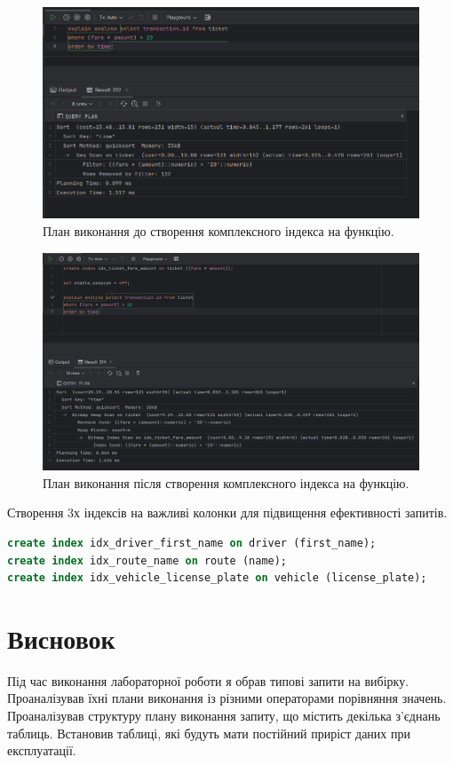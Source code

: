 \documentclass[14pt]{extreport}
\begin{document}
\begin{normalsize}
	\begin{figure}[H]
		\centering
		\includegraphics[scale=0.65]{3}
		\caption{План виконання до створення комплексного індекса на функцію.}
	\end{figure}
	
	\begin{figure}[H]
		\centering
		\includegraphics[scale=0.55]{4}
		\caption{План виконання після створення комплексного індекса на функцію.}
	\end{figure}
	Створення 3х індексів на важливі колонки для підвищення ефективності запитів.
	\begin{small}
		\begin{lstlisting}[language=sql]
create index idx_driver_first_name on driver (first_name);
create index idx_route_name on route (name);
create index idx_vehicle_license_plate on vehicle (license_plate);
		\end{lstlisting}
	\end{small}
	
	\section*{Висновок}
	Під час виконання лабораторної роботи я обрав типові запити на вибірку. Проаналізував їхні плани виконання із різними операторами порівняння значень. Проаналізував структуру плану виконання запиту, що містить декілька з’єднань таблиць. Встановив таблиці, які будуть мати постійний приріст даних при експлуатації.
	 
\end{normalsize}
\end{document}

